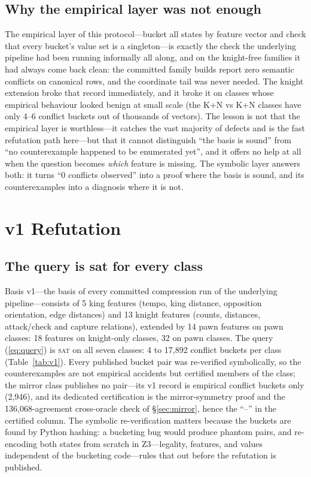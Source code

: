 \documentclass[conference]{IEEEtran}
\begin{document}
\subsection{Why the empirical layer was not enough}
The empirical layer of this protocol---bucket all states by feature vector
and check that every bucket's value set is a singleton---is exactly the
check the underlying pipeline had been running informally all along, and on
the knight-free families it had always come back clean: the committed
family builds report zero semantic conflicts on canonical rows, and the
coordinate tail was never needed. The knight extension broke that record
immediately, and it broke it on classes whose empirical behaviour looked
benign at small scale (the K+N vs K+N classes have only 4--6 conflict
buckets out of thousands of vectors). The lesson is not that the empirical
layer is worthless---it catches the vast majority of defects and is the
fast refutation path here---but that it cannot distinguish ``the basis is
sound'' from ``no counterexample happened to be enumerated yet'', and it
offers no help at all when the question becomes \emph{which} feature is
missing. The symbolic layer answers both: it turns ``0 conflicts observed''
into a proof where the basis is sound, and its counterexamples into a
diagnosis where it is not.

\section{v1 Refutation}
\label{sec:v1}

\subsection{The query is sat for every class}
Basis v1---the basis of every committed compression run of the underlying
pipeline---consists of 5 king features (tempo, king distance, opposition
orientation, edge distances) and 13 knight features (counts, distances,
attack/check and capture relations), extended by 14 pawn features on pawn
classes: 18 features on knight-only classes, 32 on pawn classes. The query
(\ref{eq:query}) is \textsc{sat} on all seven classes: 4 to 17{,}892
conflict buckets per class (Table~\ref{tab:v1}). Every published bucket
pair was re-verified symbolically, so the counterexamples are not empirical
accidents but certified members of the class; the mirror class publishes
no pair---its v1 record is empirical conflict buckets only (2{,}946), and
its dedicated certification is the mirror-symmetry proof and the
136{,}068-agreement cross-oracle check of \S\ref{sec:mirror}, hence the
``--'' in the certified column. The symbolic re-verification
matters because the buckets are found by Python hashing: a bucketing bug
would produce phantom pairs, and re-encoding both states from scratch in
Z3---legality, features, and values independent of the bucketing code---rules
that out before the refutation is published.
\end{document}
